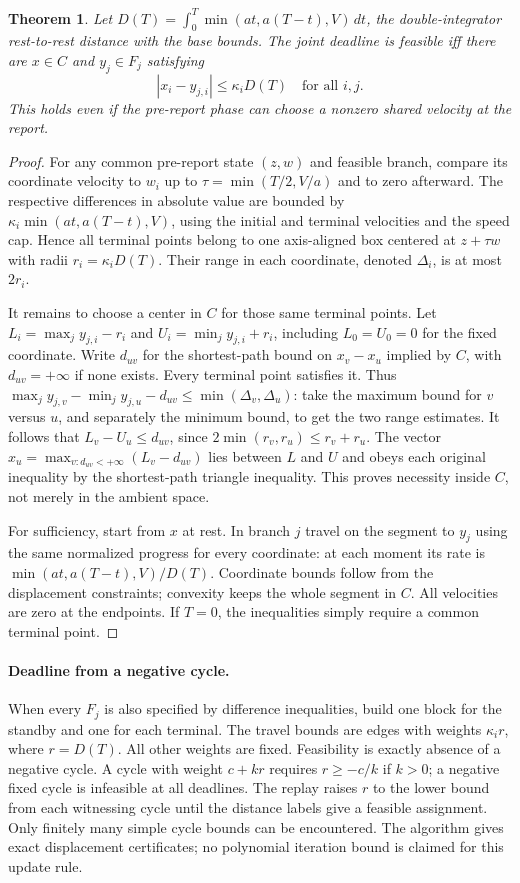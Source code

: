 \documentclass[11pt]{article}
\newtheorem{theorem}{Theorem}
\begin{document}
\begin{theorem}
Let \(D(T)=\int_0^T\min(at,a(T-t),V)\,dt\), the double-integrator
rest-to-rest distance with the base bounds. The joint deadline is
feasible iff there are \(x\in C\) and \(y_j\in F_j\) satisfying
\[
                  |x_i-y_{j,i}|\le\kappa_i D(T)\quad\text{for all }i,j.
\]
This holds even if the pre-report phase can choose a nonzero shared
velocity at the report.
\end{theorem}
\begin{proof}
For any common pre-report state \((z,w)\) and feasible branch,
compare its coordinate velocity to \(w_i\) up to
\(\tau=\min(T/2,V/a)\) and to zero afterward. The respective
differences in absolute value are bounded by
\(\kappa_i\min(at,a(T-t),V)\), using the initial and terminal
velocities and the speed cap. Hence all terminal points belong
to one axis-aligned box centered at \(z+\tau w\) with radii
\(r_i=\kappa_i D(T)\). Their range in each coordinate, denoted
\(\Delta_i\), is at most \(2r_i\).

It remains to choose a center in \(C\) for those same terminal
points. Let \(L_i=\max_j y_{j,i}-r_i\) and
\(U_i=\min_j y_{j,i}+r_i\), including \(L_0=U_0=0\) for the
fixed coordinate. Write \(d_{uv}\) for the shortest-path bound
on \(x_v-x_u\) implied by \(C\), with \(d_{uv}=+\infty\) if none
exists. Every terminal point satisfies it. Thus
\(\max_j y_{j,v}-\min_j y_{j,u}-d_{uv}\le\min(\Delta_v,\Delta_u)\):
take the maximum bound for \(v\) versus \(u\), and separately the
minimum bound, to get the two range estimates. It follows that
\(L_v-U_u\le d_{uv}\), since \(2\min(r_v,r_u)\le r_v+r_u\).
The vector \(x_u=\max_{v:d_{uv}<+\infty}(L_v-d_{uv})\) lies
between \(L\) and \(U\) and obeys each original inequality by
the shortest-path triangle inequality. This proves necessity
inside \(C\), not merely in the ambient space.

For sufficiency, start from \(x\) at rest. In branch \(j\) travel
on the segment to \(y_j\) using the same normalized progress for
every coordinate: at each moment its rate is
\(\min(at,a(T-t),V)/D(T)\). Coordinate bounds follow from the
displacement constraints; convexity keeps the whole segment in
\(C\). All velocities are zero at the endpoints. If \(T=0\),
the inequalities simply require a common terminal point.
\end{proof}

\paragraph{Deadline from a negative cycle.}
When every \(F_j\) is also specified by difference inequalities,
build one block for the standby and one for each terminal. The
travel bounds are edges with weights \(\kappa_i r\), where
\(r=D(T)\). All other weights are fixed. Feasibility is exactly
absence of a negative cycle. A cycle with weight \(c+kr\) requires
\(r\ge -c/k\) if \(k>0\); a negative fixed cycle is infeasible at
all deadlines. The replay raises \(r\) to the lower bound from each
witnessing cycle until the distance labels give a feasible assignment.
Only finitely many simple cycle bounds can be encountered. The
algorithm gives exact displacement certificates; no polynomial
iteration bound is claimed for this update rule.
\end{document}
